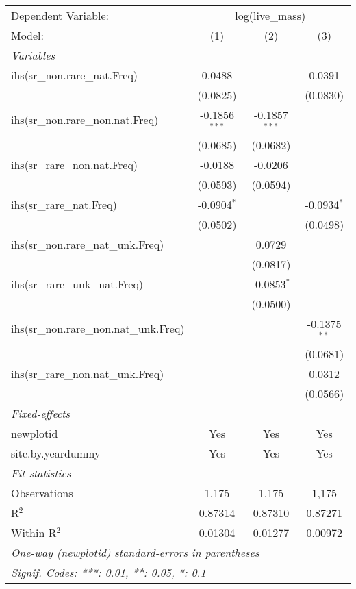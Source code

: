 \begin{tabular}{lccc}
\tabularnewline\midrule\midrule
Dependent Variable:&\multicolumn{3}{c}{log(live\_mass)}\\
Model:&(1) & (2) & (3)\\
\midrule \emph{Variables}&   &   &  \\
ihs(sr\_non.rare\_nat.Freq)&0.0488 &    & 0.0391\\
  &(0.0825) &    & (0.0830)\\
ihs(sr\_non.rare\_non.nat.Freq)&-0.1856$^{***}$ & -0.1857$^{***}$ &   \\
  &(0.0685) & (0.0682) &   \\
ihs(sr\_rare\_non.nat.Freq)&-0.0188 & -0.0206 &   \\
  &(0.0593) & (0.0594) &   \\
ihs(sr\_rare\_nat.Freq)&-0.0904$^{*}$ &    & -0.0934$^{*}$\\
  &(0.0502) &    & (0.0498)\\
ihs(sr\_non.rare\_nat\_unk.Freq)&   & 0.0729 &   \\
  &   & (0.0817) &   \\
ihs(sr\_rare\_unk\_nat.Freq)&   & -0.0853$^{*}$ &   \\
  &   & (0.0500) &   \\
ihs(sr\_non.rare\_non.nat\_unk.Freq)&   &    & -0.1375$^{**}$\\
  &   &    & (0.0681)\\
ihs(sr\_rare\_non.nat\_unk.Freq)&   &    & 0.0312\\
  &   &    & (0.0566)\\
\midrule \emph{Fixed-effects}&   &   &  \\
newplotid & Yes & Yes & Yes\\
site.by.yeardummy & Yes & Yes & Yes\\
\midrule \emph{Fit statistics}&  & & \\
Observations & 1,175&1,175&1,175\\
R$^2$ & 0.87314&0.87310&0.87271\\
Within R$^2$ & 0.01304&0.01277&0.00972\\
\midrule\midrule\multicolumn{4}{l}{\emph{One-way (newplotid) standard-errors in parentheses}}\\
\multicolumn{4}{l}{\emph{Signif. Codes: ***: 0.01, **: 0.05, *: 0.1}}\\
\end{tabular}


